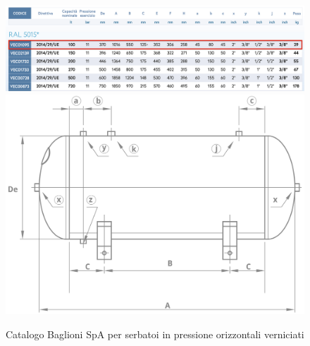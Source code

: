 \begin{figure}[h]
    \centering
    \includegraphics[scale=0.27]{Immagini/CatalogoSerbatoio1.png}
    \includegraphics[scale=0.45]{Immagini/CatalogoSerbatoio2.png}
    \caption{Catalogo Baglioni SpA per serbatoi in pressione orizzontali verniciati}
    \label{fig:CatalogoSerbatoio}
\end{figure}
\newpage

